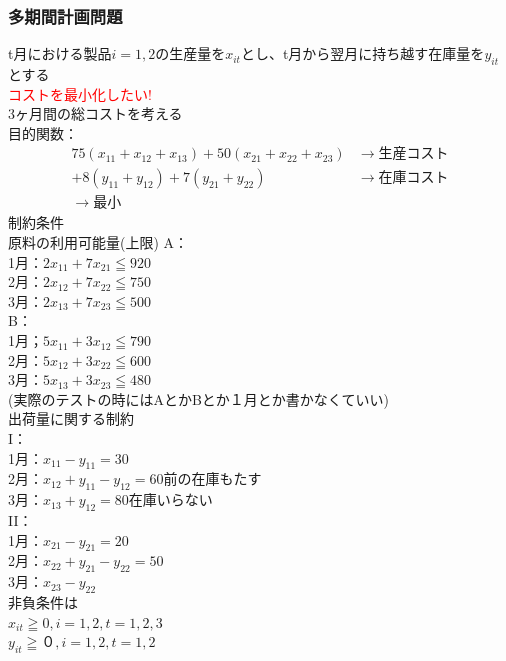 \documentclass{jsarticle}
\begin{document}
				\subsubsection{多期間計画問題}
					t月における製品$i=1,2$の生産量を$x_{it}$とし、t月から翌月に持ち越す在庫量を$y_{it}$とする\\
					{\textcolor{red}{コストを最小化したい!}\\
					3ヶ月間の総コストを考える\\
					目的関数：\\
					\begin{eqnarray}
						75(x_{11}+x_{12}+x_{13})+50(x_{21}+x_{22}+x_{23}) &→生産コスト\\ 
						+8(y_{11}+y_{12})+7(y_{21}+y_{22}) &→在庫コスト\\
						→最小
					\end{eqnarray}
					制約条件\\
					原料の利用可能量(上限)
					A：\\
					1月：$2x_{11}+7x_{21}≦920$\\
					2月：$2x_{12}+7x_{22}≦750$\\
					3月：$2x_{13}+7x_{23}≦500$\\
					B：\\
					1月；$5x_{11}+3x_{12}≦790$\\
					2月：$5x_{12}+3x_{22}≦600$\\
					3月：$5x_{13}+3x_{23}≦480$\\
					(実際のテストの時にはAとかBとか１月とか書かなくていい)\\
					出荷量に関する制約\\
					I：\\
					1月：$x_{11}-y_{11}=30$\\
					2月：$x_{12}+y_{11}-y_{12}=60 前の在庫もたす$\\
					3月：$x_{13}+y_{12}=80 在庫いらない$\\
					II：\\
					1月：$x_{21}-y_{21}=20$\\
					2月：$x_{22}+y_{21}-y_{22}=50$\\
					3月：$x_{23}-y_{22}$\\
					非負条件は\\
					$x_{it}≧0 , i=1,2 ,t=1,2,3$\\
					$y_{it}≧０, i=1,2 , t=1,2$\\
}
\end{document}
